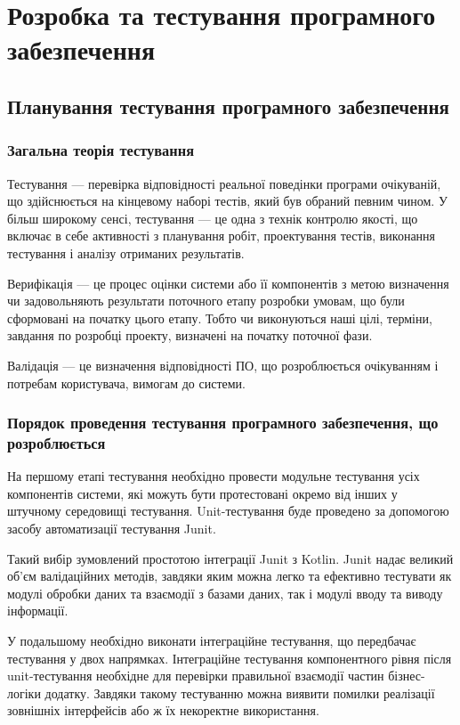 \section{Розробка та тестування програмного забезпечення}
\subsection{Планування тестування програмного забезпечення}
\subsubsection{Загальна теорія тестування}
Тестування --- перевірка відповідності реальної поведінки програми очікуваній, що здійснюється на кінцевому наборі тестів, який був обраний певним чином. 
У більш широкому сенсі, тестування --- це одна з технік контролю якості, що включає в себе активності з планування робіт, проектування тестів, виконання тестування і аналізу отриманих результатів.

Верифікація --- це процес оцінки системи або її компонентів з метою визначення чи задовольняють результати поточного етапу розробки умовам, що були сформовані на початку цього етапу. 
Тобто чи виконуються наші цілі, терміни, завдання по розробці проекту, визначені на початку поточної фази.

Валідація --- це визначення відповідності ПО, що розроблюється очікуванням і потребам користувача, вимогам до системи. 

\subsubsection{Порядок проведення тестування програмного забезпечення, що розроблюється}
На першому етапі тестування необхідно провести модульне тестування усіх компонентів системи, які можуть бути протестовані окремо від інших у штучному середовищі тестування. 
Unit-тестування буде проведено за допомогою засобу автоматизації тестування Junit.

Такий вибір зумовлений простотою інтеграції Junit з Kotlin. 
Junit надає великий об'єм валідаційних методів, завдяки яким можна легко та ефективно тестувати як модулі обробки даних та взаємодії з базами даних, так і модулі вводу та виводу інформації.

У подальшому необхідно виконати інтеграційне тестування, що передбачає тестування у двох напрямках.
Інтеграційне тестування компонентного рівня після unit-тестування необхідне для перевірки правильної взаємодії частин бізнес-логіки додатку. 
Завдяки такому тестуванню можна виявити помилки реалізації зовнішніх інтерфейсів або ж їх некоректне використання.

